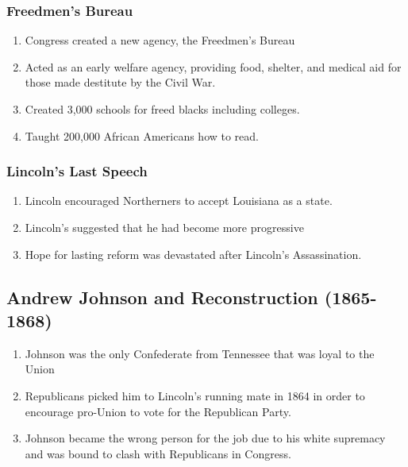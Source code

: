 \documentclass[12pt]{article} %
\begin{document}
\subsubsection{Freedmen's Bureau}
\begin{enumerate}
	\item Congress created a new agency, the Freedmen's Bureau
	\item Acted as an early welfare agency, providing food, shelter, and medical aid for those made
		destitute by the Civil War.
	\item Created 3,000 schools for freed blacks including colleges.
	\item Taught 200,000 African Americans how to read.
\end{enumerate}

\subsubsection{Lincoln's Last Speech}
\begin{enumerate}
	\item Lincoln encouraged Northerners to accept Louisiana as a state.
	\item Lincoln's suggested that he had become more progressive 
	\item Hope for lasting reform was devastated after Lincoln's Assassination.
\end{enumerate}

\subsection{Andrew Johnson and Reconstruction (1865-1868)}
\begin{enumerate}
	\item Johnson was the only Confederate from Tennessee that was loyal to the Union
	\item Republicans picked him to Lincoln's running mate in 1864 in order to encourage pro-Union
		to vote for the Republican Party.
	\item Johnson became the wrong person for the job due to his white supremacy and was bound to 
		clash with Republicans in Congress.
\end{enumerate}
\end{document}
